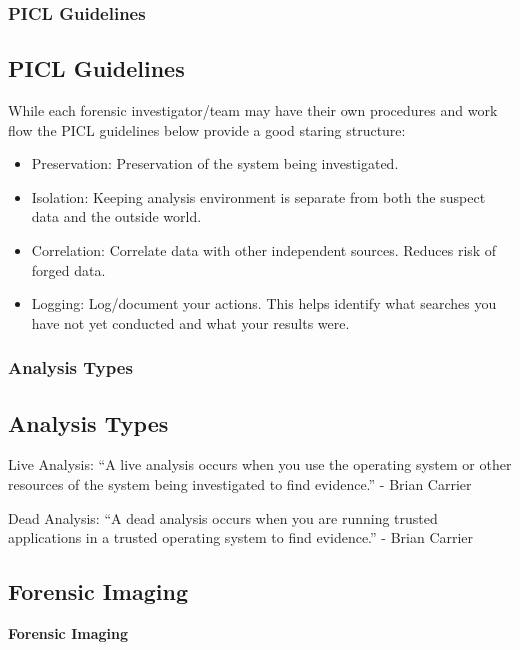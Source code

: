 \documentclass{beamer}
\begin{document}
\begin{frame}
	\frametitle{PICL Guidelines}
	\subsection*{PICL Guidelines}
	While each forensic investigator/team may have their own procedures and work flow the PICL guidelines below provide a good staring structure:
	\begin{itemize}
		\item Preservation:	 Preservation of the system being investigated.
		\item Isolation:	 Keeping analysis environment is separate from both the suspect data and the outside world.
		\item Correlation:	 Correlate data with other independent sources. Reduces risk of forged data.
		\item Logging:	 Log/document your actions. This helps identify what searches you have not yet conducted and what your results were.
	\end{itemize}
\end{frame}

\begin{frame}
	\frametitle{Analysis Types}
	\subsection*{Analysis Types}
	\begin{block}{Live Analysis:}
		``A live analysis occurs when you use the operating system or other resources of the system being investigated to find evidence.'' - Brian Carrier
	\end{block}

	\begin{block}{Dead Analysis:}
		``A dead analysis occurs when you are running trusted applications in a trusted operating system to find evidence.'' - Brian Carrier
	\end{block}
\end{frame}

\begin{frame} %
	\section{Forensic Imaging}
	\begin{center}
		\Huge\textbf{Forensic Imaging}
	\end{center}
\end{frame}
\end{document}
